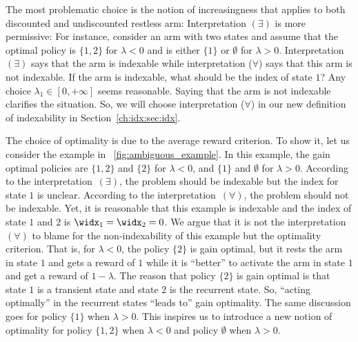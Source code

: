 The most problematic choice is the notion of increasingness that applies to both discounted and undiscounted restless arm: Interpretation $(\exists)$ is more permissive: For instance, consider an arm with two states and assume that the optimal policy is $\{1,2\}$ for $\lambda<0$ and is either $\{1\}$ or $\emptyset$ for $\lambda>0$.
Interpretation $(\exists)$ says that the arm is indexable while interpretation ($\forall$) says that this arm is not indexable.
If the arm is indexable, what should be the index of state $1$?
Any choice $\lambda_1\in[0,+\infty]$ seems reasonable.
Saying that the arm is not indexable clarifies the situation.
So, we will choose interpretation ($\forall$) in our new definition of indexability in Section~\ref{ch:idx:sec:idx}.

The choice of optimality is due to the average reward criterion.
To show it, let us consider the example in \figurename~\ref{fig:ambiguous_example}.
In this example, the gain optimal policies are $\{1,2\}$ and $\{2\}$ for $\lambda<0$, and $\{1\}$ and $\emptyset$ for $\lambda>0$.
According to the interpretation~$(\exists)$, the problem should be indexable but the index for state $1$ is unclear.
According to the interpretation~$(\forall)$, the problem should not be indexable.
Yet, it is reasonable that this example is indexable and the index of state $1$ and $2$ is $\widx_1=\widx_2=0$.
We argue that it is not the interpretation~$(\forall)$ to blame for the non-indexability of this example but the optimality criterion.
That is, for $\lambda<0$, the policy $\{2\}$ is gain optimal, but it rests the arm in state $1$ and gets a reward of $1$ while it is ``better'' to activate the arm in state $1$ and get a reward of $1-\lambda$. 
The reason that policy $\{2\}$ is gain optimal is that state $1$ is a transient state and state $2$ is the recurrent state.
So, ``acting optimally'' in the recurrent states ``leads to'' gain optimality.
The same discussion goes for policy $\{1\}$ when $\lambda>0$.
This inspires us to introduce a new notion of optimality for policy $\{1,2\}$ when $\lambda<0$ and policy $\emptyset$ when $\lambda>0$.


